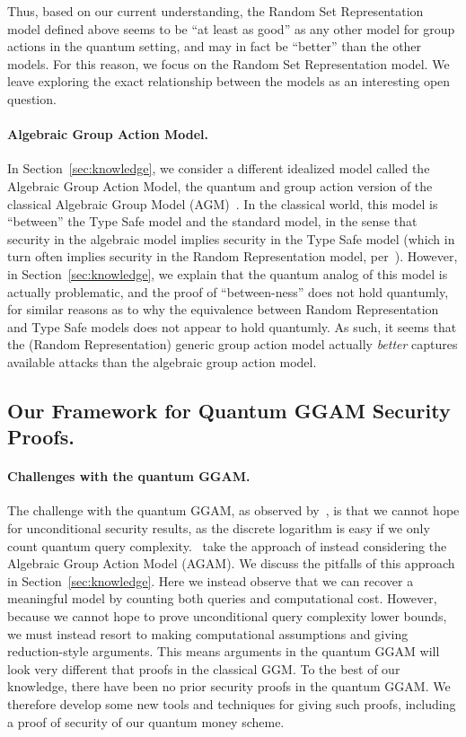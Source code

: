 \documentclass{article}\usepackage[a4paper,margin=20mm]{geometry}
\numberwithin{theorem}{section}
\numberwithin{equation}{section}
\begin{document}
Thus, based on our current understanding, the Random Set Representation model defined above seems to be ``at least as good'' as any other model for group actions in the quantum setting, and may in fact be ``better'' than the other models. For this reason, we focus on the Random Set Representation model. We leave exploring the exact relationship between the models as an interesting open question.

\paragraph{Algebraic Group Action Model.} In Section~\ref{sec:knowledge}, we consider a different idealized model called the Algebraic Group Action Model, the quantum and group action version of the classical Algebraic Group Model (AGM)~\cite{C:FucKilLos18}. In the classical world, this model is ``between'' the Type Safe model and the standard model, in the sense that security in the algebraic model implies security in the Type Safe model (which in turn often implies security in the Random Representation model, per~\cite{C:Zhandry22b}). However, in Section~\ref{sec:knowledge}, we explain that the quantum analog of this model is actually problematic, and the proof of ``between-ness'' does not hold quantumly, for similar reasons as to why the equivalence between Random Representation and Type Safe models does not appear to hold quantumly. As such, it seems that the (Random Representation) generic group action model actually \emph{better} captures available attacks than the algebraic group action model.




\subsection{Our Framework for Quantum GGAM Security Proofs.}

\paragraph{Challenges with the quantum GGAM.} The challenge with the quantum GGAM, as observed by~\cite{PKC:DHKKLR23}, is that we cannot hope for unconditional security results, as the discrete logarithm is easy if we only count quantum query complexity.~\cite{PKC:DHKKLR23} take the approach of instead considering the Algebraic Group Action Model (AGAM). We discuss the pitfalls of this approach in Section~\ref{sec:knowledge}. Here we instead observe that we can recover a meaningful model by counting both queries and computational cost. However, because we cannot hope to prove unconditional query complexity lower bounds, we must instead resort to making computational assumptions and giving reduction-style arguments. This means arguments in the quantum GGAM will look very different that proofs in the classical GGM. To the best of our knowledge, there have been no prior security proofs in the quantum GGAM. We therefore develop some new tools and techniques for giving such proofs, including a proof of security of our quantum money scheme.
\end{document}
